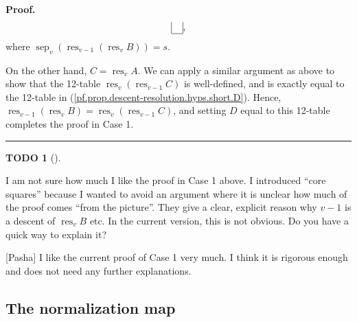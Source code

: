\documentclass[numbers=enddot,12pt,final,onecolumn,notitlepage]{scrartcl}%
\theoremstyle{definition}
\newtheorem{quest}[theo]{TODO}
\newenvironment{todo}[1][]
{\begin{quest}[#1]\begin{leftbar}}
{\end{leftbar}\end{quest}}
\newenvironment{proof}[1][Proof]{\noindent\textbf{#1.} }{\ \rule{0.5em}{0.5em}}
\begin{document}
\begin{proof}
\begin{equation}
\begin{tabular}{ccc}
\cline{2-2} \multicolumn{1}{|c|}{} \\
\cline{1-1}
\end{tabular}%
, \label{pf.prop.descent-resolution.hyps.short.D}%
\end{equation}
where $\operatorname*{sep}\nolimits_{v} \left( \operatorname*{res}\nolimits_{v-1}\left(  \operatorname*{res}\nolimits_{v}%
B\right) \right) = s$.

On the other hand, $C = \operatorname*{res}\nolimits_{v}A$. We can apply a similar argument as above to show that the 12-table $\operatorname*{res}\nolimits_{v}\left(
\operatorname*{res}\nolimits_{v-1}C\right)  $ is well-defined, and is exactly equal to the 12-table in (\ref{pf.prop.descent-resolution.hyps.short.D}).
Hence, $\operatorname*{res}%
\nolimits_{v-1}\left(  \operatorname*{res}\nolimits_{v}B\right) = \operatorname*{res}\nolimits_{v}\left(
\operatorname*{res}\nolimits_{v-1}C\right)$, and setting $D$ equal to this 12-table completes the proof in Case 1.
\end{proof}

\begin{todo}
I am not sure how much I like the proof in Case 1 above. I introduced
``core squares'' because I wanted to avoid an argument where it is
unclear how much of the proof comes ``from the picture''. They give a
clear, explicit reason why $v-1$ is a descent of
$\operatorname{res}_v B$ etc. In the current version, this is not
obvious. Do you have a quick way to explain it?

[Pasha]  I like the current proof of Case 1 very much. I think it is rigorous enough and does not need any further explanations.
\end{todo}

\subsection{The normalization map}
\end{document}
